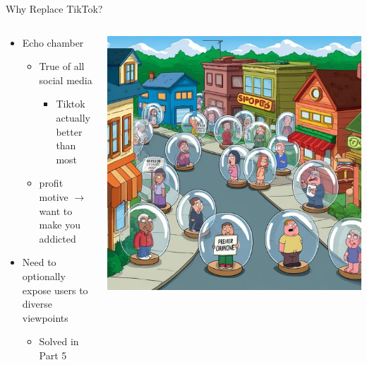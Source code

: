 \documentclass[aspectratio=169]{beamer}
\begin{document}
\begin{frame}{Why Replace TikTok?}
\begin{columns}[T]
    \begin{column}[T]{0.5\textwidth}
        \begin{itemize}
            \item Echo chamber
            \begin{itemize}
                \item True of all social media
                \begin{itemize}
                    \item Tiktok actually better than most
                \end{itemize}
                \item profit motive $\rightarrow$ want to make you addicted
            \end{itemize}
            \item Need to optionally expose users to diverse viewpoints
            \begin{itemize}
                \item Solved in Part 5
            \end{itemize}
        \end{itemize}
    \end{column}
    \begin{column}{0.5\textwidth}
        \includegraphics[height=0.8\textheight]{imgs/why_replace/bubble_town.jpeg}
    \end{column}
\end{columns}
\end{frame}
\end{document}
